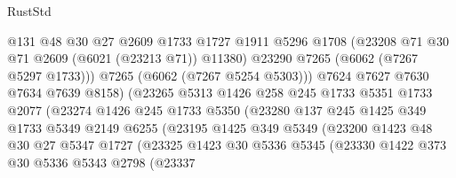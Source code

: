 \begin{lexlean}{RustStd}
\begin{coremodule}
                              @131
                              @48
                              @30
                              @27
                              @2609
                              @1733
                              @1727
                              @1911
                              @5296
                              @1708
                              (@23208 @71 @30 @71 @2609 (@6021 (@23213 @71)) @11380)
                              @23290
                              @7265
                              (@6062 (@7267 @5297 @1733)))
                            @7265
                            (@6062 (@7267 @5254 @5303)))
                          @7624
                          @7627
                          @7630
                          @7634
                          @7639
                          @8158)
                        (@23265
                          @5313
                          @1426
                          @258
                          @245
                          @1733
                          @5351
                          @1733
                          @2077
                          (@23274
                            @1426
                            @245
                            @1733
                            @5350
                            (@23280
                              @137
                              @245
                              @1425
                              @349
                              @1733
                              @5349
                              @2149
                              @6255
                              (@23195
                                @1425
                                @349
                                @5349
                                (@23200
                                  @1423
                                  @48
                                  @30
                                  @27
                                  @5347
                                  @1727
                                  (@23325
                                    @1423
                                    @30
                                    @5336
                                    @5345
                                    (@23330
                                      @1422
                                      @373
                                      @30
                                      @5336
                                      @5343
                                      @2798
                                      (@23337

\end{coremodule}
\end{lexlean}
